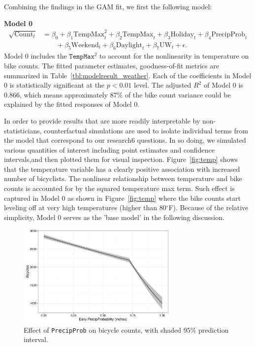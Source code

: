 \documentclass [11pt, proquest] {uwthesis}[2015/03/03]
\begin{document}
Combining the findings in the GAM fit, we first the following model:

\textbf{Model 0}
\begin{align}
\sqrt{\text{Count}_t} &= \beta_0 + \beta_1 \text{TempMax}^2_t + \beta_2 \text{TempMax}_t + \beta_3 \text{Holiday}_t + \beta_4 \text{PrecipProb}_t  \nonumber\\
&\qquad + \beta_5 \text{Weekend}_t + \beta_6 \text{Daylight}_t + \beta_7 \text{UW}_t + \epsilon.\label{eqref:model0}
\end{align}
Model 0 includes the $\texttt{TempMax}^2$ to account for the nonlinearity in temperature on bike counts. The fitted parameter estimates, goodness-of-fit metrics are summarized in Table~\ref{tbl:modelresult_weather}. Each of the coefficients in Model 0 is statistically significant at the $p<0.01$ level. The adjusted $R^2$ of Model 0 is 0.866, which means approximately 87\% of the bike count variance could be explained by the fitted responses of Model 0. 

In order to provide results that are more readily interpretable by non-statisticians, counterfactual simulations are used to isolate individual terms from the model that correspond to our research6 questions. In so doing, we simulated various quantities of interest including point estimates and  confidence intervals,and then plotted them for visual inspection. Figure~\ref{fig:temp} shows that the temperature variable has a clearly positive association with increased number of bicyclists. The nonlinear relationship between temperature and bike counts is accounted for by the squared temperature max term. Such effect is captured in Model 0 as shown in Figure~\ref{fig:temp} where the bike counts start leveling off at very high temperatures (higher than 80$^\circ$F). Because of the relative simplicity, Model 0 serves as the 'base model' in the following discussion. 

\begin{figure}
\centering
   \includegraphics[width=0.7\textwidth]{figures/sim/precip} 
  \caption{Effect of \texttt{PrecipProb} on bicycle counts, with shaded 95\% prediction interval.}
  \label{fig:precip}
\end{figure}
\end{document}
